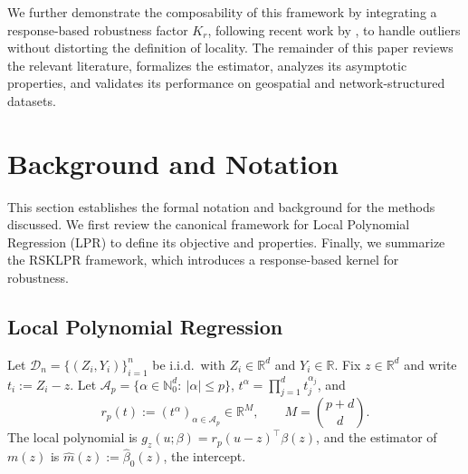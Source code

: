 \documentclass[final,1p,times,authoryear]{elsarticle}
\newcommand{\R}{\mathbb{R}}
\newcommand{\D}{\mathcal{D}}
\begin{document}
We further demonstrate the composability of this framework by integrating a response-based robustness factor $K_r$, following recent work by \citet{shulman2025robust}, to handle outliers without distorting the definition of locality. The remainder of this paper reviews the relevant literature, formalizes the estimator, analyzes its asymptotic properties, and validates its performance on geospatial and network-structured datasets.

\section{Background and Notation}
\label{s:Background}
This section establishes the formal notation and background for the methods discussed. We first review the canonical framework for Local Polynomial Regression (LPR) to define its objective and properties. Finally, we summarize the RSKLPR framework, which introduces a response-based kernel for robustness.

\subsection{Local Polynomial Regression}
\label{s:background_lpr}

Let $\D_{n}=\{(Z_i,Y_i)\}_{i=1}^{n}$ be i.i.d.\ with $Z_i\in\R^d$ and $Y_i\in\R$. Fix $z\in\R^d$ and write $t_i:=Z_i-z$. Let $\mathcal{A}_p=\{\alpha\in\mathbb{N}_0^d:\ |\alpha|\le p\}$, $t^\alpha=\prod_{j=1}^{d} t_j^{\alpha_j}$, and
\[
r_p(t):=(t^\alpha)_{\alpha\in\mathcal{A}_p}\in\R^{M},\qquad M=\binom{p+d}{d}.
\]
The local polynomial is $g_z(u;\beta)=r_p(u-z)^\top\beta(z)$, and the estimator of $m(z)$ is $\hat m(z):=\hat\beta_0(z)$, the intercept.
\end{document}
